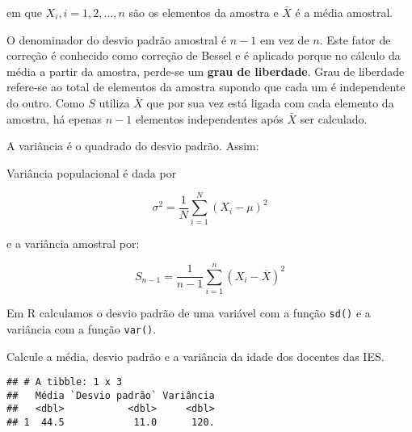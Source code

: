 \documentclass[12pt,]{style/krantz}
\makeatletter
\newenvironment{Shaded}{\begin{snugshade}}{\end{snugshade}}
\newcommand{\KeywordTok}[1]{\textcolor[rgb]{0.13,0.29,0.53}{\textbf{#1}}}
\newcommand{\DataTypeTok}[1]{\textcolor[rgb]{0.13,0.29,0.53}{#1}}
\newcommand{\StringTok}[1]{\textcolor[rgb]{0.31,0.60,0.02}{#1}}
\newcommand{\OperatorTok}[1]{\textcolor[rgb]{0.81,0.36,0.00}{\textbf{#1}}}
\newcommand{\NormalTok}[1]{#1}
\renewenvironment{quote}{\begin{VF}}{\end{VF}}
\newenvironment{kframe}{%
\medskip{}
\setlength{\fboxsep}{.8em}
 \def\at@end@of@kframe{}%
 \ifinner\ifhmode%
  \def\at@end@of@kframe{\end{minipage}}%
  \begin{minipage}{\columnwidth}%
 \fi\fi%
 \def\FrameCommand##1{\hskip\@totalleftmargin \hskip-\fboxsep
 \colorbox{shadecolor}{##1}\hskip-\fboxsep
     \hskip-\linewidth \hskip-\@totalleftmargin \hskip\columnwidth}%
 \MakeFramed {\advance\hsize-\width
   \@totalleftmargin\z@ \linewidth\hsize
   \@setminipage}}%
 {\par\unskip\endMakeFramed%
 \at@end@of@kframe}
\renewenvironment{Shaded}{\begin{kframe}}{\end{kframe}}
\theoremstyle{definition}
\theoremstyle{definition}
\theoremstyle{definition}
\theoremstyle{remark}
\let\BeginKnitrBlock\begin \let\EndKnitrBlock\end
\makeatother
\begin{document}
em que \(X_i,i=1,2,...,n\) são os elementos da amostra e \(\bar X\) é a
média amostral.

\begin{quote}
O denominador do desvio padrão amostral é \(n-1\) em vez de \(n\). Este
fator de correção é conhecido como correção de Bessel
\citep{reichmann1961use} e é aplicado porque no cálculo da média a
partir da amostra, perde-se um \textbf{grau de liberdade}. Grau de
liberdade refere-se ao total de elementos da amostra supondo que cada um
é independente do outro. Como \(S\) utiliza \(\bar X\) que por sua vez
está ligada com cada elemento da amostra, há epenas \(n-1\) elementos
independentes após \(\bar X\) ser calculado.
\end{quote}

A variância é o quadrado do desvio padrão. Assim:

Variância populacional é dada por

\[\sigma^2 ={{\frac {1}{N}}\sum _{i=1}^{N}(X_{i}-\mu )^{2}}\]

e a variância amostral por:

\[S_{n-1}={{\frac {1}{n-1}}\sum _{i=1}^{n}(X_{i}-{\overline {X}})^{2}}\]

Em R calculamos o desvio padrão de uma variável com a função
\texttt{sd()} e a variância com a função \texttt{var()}.

\BeginKnitrBlock{example}
\protect\hypertarget{exm:unnamed-chunk-61}{}{\label{exm:unnamed-chunk-61}
}Calcule a média, desvio padrão e a variância da idade dos docentes das
IES.
\EndKnitrBlock{example}

\begin{Shaded}
\end{Shaded}

\begin{verbatim}
## # A tibble: 1 x 3
##   Média `Desvio padrão` Variância
##   <dbl>           <dbl>     <dbl>
## 1  44.5            11.0      120.
\end{verbatim}
\end{document}

